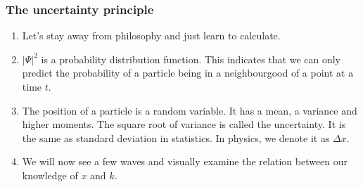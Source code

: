 \documentclass{beamer}
\begin{document}
\begin{frame}
\frametitle{The uncertainty principle}
\begin{enumerate}
\item Let's stay away from philosophy and just learn to calculate.
\item $|\Psi|^2$ is a probability distribution function. This indicates that we
can only predict the probability of a particle being in a neighbourgood of a 
point at a time $t$.
\item The position of a particle is a random variable. It has a mean, a variance
and higher moments. The square root of variance is called the uncertainty. It
is the same as standard deviation in statistics. In physics, we denote it as
$\Delta x$.
\item We will now see a few waves and visually examine the relation between 
our knowledge of $x$ and $k$.
\end{enumerate}
\end{frame}
\end{document}
